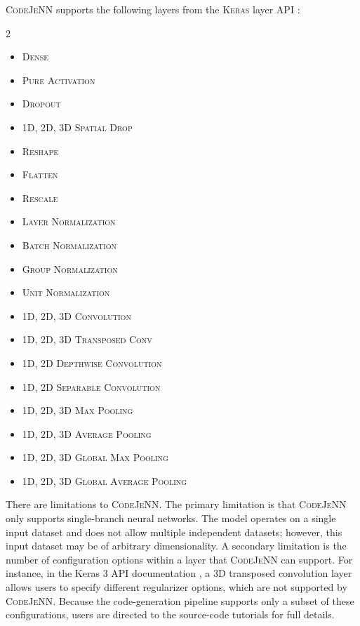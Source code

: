 \documentclass[preprint,12pt, a4paper]{elsarticle}
\begin{document}
\textsc{CodeJeNN} supports the following layers from the \textsc{Keras} layer API \cite{chollet_keras_2015}:
\setlength{\columnsep}{-5em}
\begin{multicols}{2}
\begin{itemize}[itemsep=-5pt, topsep=0pt, leftmargin=*]
    \item[] \textsc{Dense}
    \item[] \textsc{Pure Activation}
    \item[] \textsc{Dropout}
    \item[] \textsc{1D, 2D, 3D Spatial Drop} \cite{tompson_efficient_2015}
    \item[] \textsc{Reshape}
    \item[] \textsc{Flatten}
    \item[] \textsc{Rescale}
    \item[] \textsc{Layer Normalization}
    \item[] \textsc{Batch Normalization}
    \item[] \textsc{Group Normalization}
    \item[] \textsc{Unit Normalization}
    \item[] \textsc{1D, 2D, 3D Convolution}
    \item[] \textsc{1D, 2D, 3D Transposed Conv} \cite{dumoulin_guide_2018, zeiler_deconvolutional_2010}
    \item[] \textsc{1D, 2D Depthwise Convolution}
    \item[] \textsc{1D, 2D Separable Convolution}
    \item[] \textsc{1D, 2D, 3D Max Pooling}
    \item[] \textsc{1D, 2D, 3D Average Pooling}
    \item[] \textsc{1D, 2D, 3D Global Max Pooling}
    \item[] \textsc{1D, 2D, 3D Global Average Pooling}
\end{itemize}
\end{multicols}

There are limitations to \textsc{CodeJeNN}. The primary limitation is that \textsc{CodeJeNN} only supports single-branch neural networks. The model operates on a single input dataset and does not allow multiple independent datasets; however, this input dataset may be of arbitrary dimensionality. A secondary limitation is the number of configuration options within a layer that \textsc{CodeJeNN} can support. For instance, in the Keras 3 API documentation \cite{chollet_keras_2015}, a 3D transposed convolution layer allows users to specify different regularizer options, which are not supported by \textsc{CodeJeNN}. Because the code-generation pipeline supports only a subset of these configurations, users are directed to the source-code tutorials for full details.
\end{document}
